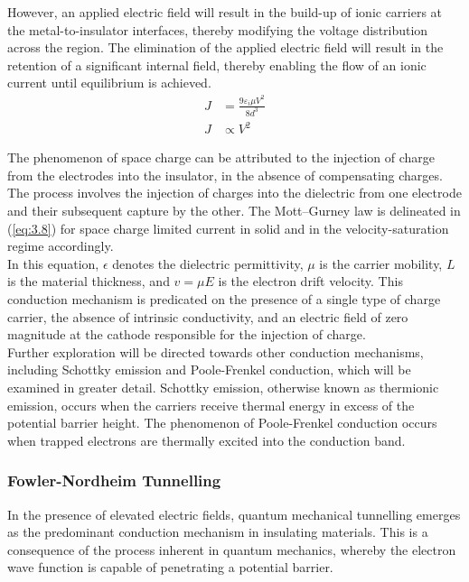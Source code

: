 \noindent However, an applied electric field will result in the build-up of ionic carriers at the metal-to-insulator interfaces, thereby modifying the voltage distribution across the region. The elimination of the applied electric field will result in the retention of a significant internal field, thereby enabling the flow of an ionic current until equilibrium is achieved.
\begin{align}
    J &= \frac{9\varepsilon _i \mu V^2}{8d^3} \label{eq:3.8} \\
    J &\propto V^2 \label{eq:3.9}
\end{align}

\noindent The phenomenon of space charge can be attributed to the injection of charge from the electrodes into the insulator, in the absence of compensating charges. The process involves the injection of charges into the dielectric from one electrode and their subsequent capture by the other. The Mott–Gurney law is delineated in (\ref{eq:3.8}) for space charge limited current in solid and in the velocity-saturation regime accordingly. \\

\noindent In this equation, $\epsilon$ denotes the dielectric permittivity, $\mu$ is the carrier mobility, $L$ is the material thickness, and $v = \mu E$ is the electron drift velocity. This conduction mechanism is predicated on the presence of a single type of charge carrier, the absence of intrinsic conductivity, and an electric field of zero magnitude at the cathode responsible for the injection of charge.\\

\noindent Further exploration will be directed towards other conduction mechanisms, including Schottky emission and Poole-Frenkel conduction, which will be examined in greater detail. Schottky emission, otherwise known as thermionic emission, occurs when the carriers receive thermal energy in excess of the potential barrier height. The phenomenon of Poole-Frenkel conduction occurs when trapped electrons are thermally excited into the conduction band.

\subsubsection[Fowler-Nordheim Tunnelling]{Fowler-Nordheim Tunnelling}

\noindent In the presence of elevated electric fields, quantum mechanical tunnelling emerges as the predominant conduction mechanism in insulating materials. This is a consequence of the process inherent in quantum mechanics, whereby the electron wave function is capable of penetrating a potential barrier. \\

